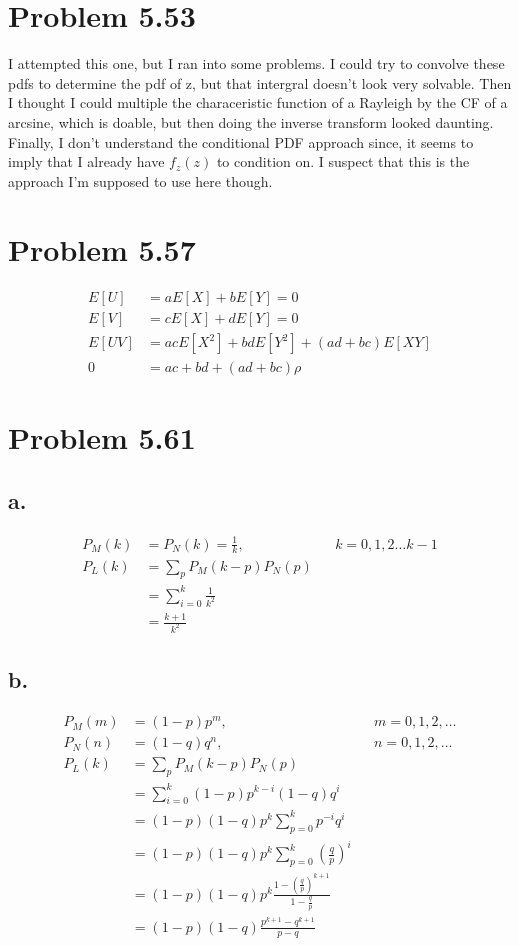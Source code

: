 \documentclass[12pt]{article}
\begin{document}
\section{Problem 5.53}
I attempted this one, but I ran into some problems. I could try to convolve these pdfs to determine the pdf of z, but that intergral
doesn't look very solvable. Then I thought I could multiple the characeristic function of a Rayleigh by the CF of a arcsine, which
is doable, but then doing the inverse transform looked daunting. Finally, I don't understand the conditional PDF approach since,
it seems to imply that I already have $f_z(z)$ to condition on. I suspect that this is the approach I'm supposed to use here though. 
\section{Problem 5.57}
\begin{align*}
  E[U] &= aE[X] + bE[Y] = 0 \\
  E[V] &= cE[X] + dE[Y] = 0 \\
  E[UV] &= acE[X^2] + bdE[Y^2] + (ad+bc)E[XY] \\
  0 &= ac + bd + (ad+bc)\rho
\end{align*}

\section{Problem 5.61}
\subsection{a.}
\begin{align*}
  P_M(k) &= P_N(k) = \frac{1}{k}, & & k = 0,1,2 \dots k-1 \\
  P_L(k) &= \sum_p P_M(k-p)P_N(p) \\
  &= \sum_{i=0}^k \frac{1}{k^2} \\
  &= \frac{k+1}{k^2}
\end{align*}

\subsection{b.}
\begin{align*}
  P_M(m) &= (1-p)p^m, & &  m = 0,1,2,\dots \\
  P_N(n) &= (1-q)q^n, & &  n = 0,1,2,\dots \\
  P_L(k) &= \sum_p P_M(k-p)P_N(p) \\
  &= \sum_{i=0}^k (1-p)p^{k-i}(1-q)q^i \\
  &= (1-p)(1-q)p^k\sum_{p=0}^k p^{-i}q^i \\
  &= (1-p)(1-q)p^k\sum_{p=0}^k \left( \frac{q}{p} \right)^i \\
  &= (1-p)(1-q)p^k \frac{1-\left(\frac{q}{p}\right)^{k+1}}{1-\frac{q}{p}} \\
  &= (1-p)(1-q) \frac{p^{k+1}-q^{k+1}}{p-q}
\end{align*}
\end{document}
